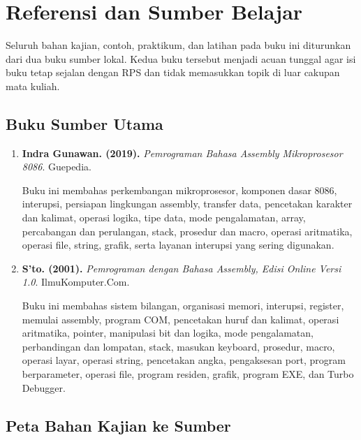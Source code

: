 \chapter{Referensi dan Sumber Belajar}
\label{app:referensi-tambahan}

Seluruh bahan kajian, contoh, praktikum, dan latihan pada buku ini
diturunkan dari dua buku sumber lokal. Kedua buku tersebut menjadi
acuan tunggal agar isi buku tetap sejalan dengan RPS dan tidak
memasukkan topik di luar cakupan mata kuliah.

\section{Buku Sumber Utama}

\begin{enumerate}
    \item \textbf{Indra Gunawan. (2019).}
          \textit{Pemrograman Bahasa Assembly Mikroprosesor 8086}.
          Guepedia. \cite{gunawan2019}

          Buku ini membahas perkembangan mikroprosesor, komponen dasar
          8086, interupsi, persiapan lingkungan assembly, transfer data,
          pencetakan karakter dan kalimat, operasi logika, tipe data,
          mode pengalamatan, array, percabangan dan perulangan, stack,
          prosedur dan macro, operasi aritmatika, operasi file, string,
          grafik, serta layanan interupsi yang sering digunakan.

    \item \textbf{S'to. (2001).}
          \textit{Pemrograman dengan Bahasa Assembly, Edisi Online
          Versi 1.0}. IlmuKomputer.Com. \cite{sto2001}

          Buku ini membahas sistem bilangan, organisasi memori,
          interupsi, register, memulai assembly, program COM, pencetakan
          huruf dan kalimat, operasi aritmatika, pointer, manipulasi bit
          dan logika, mode pengalamatan, perbandingan dan lompatan,
          stack, masukan keyboard, prosedur, macro, operasi layar,
          operasi string, pencetakan angka, pengaksesan port, program
          berparameter, operasi file, program residen, grafik, program
          EXE, dan Turbo Debugger.
\end{enumerate}

\section{Peta Bahan Kajian ke Sumber}


